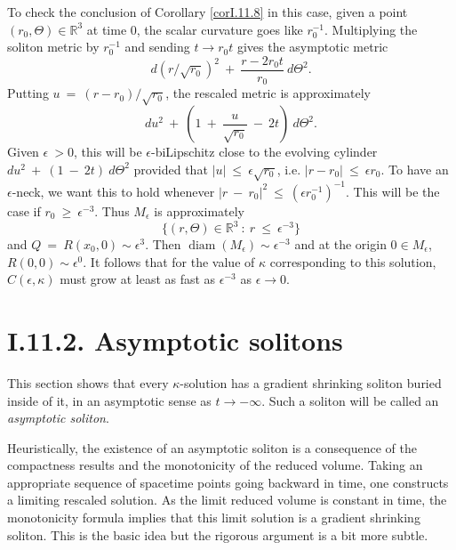 \documentclass[12pt]{amsart}
\newcommand{\diam}{\operatorname{diam}}
\newcommand{\R}{{\mathbb R}}
\numberwithin{equation}{section}
\theoremstyle{plain}
\theoremstyle{definition}
\theoremstyle{remark}
\begin{document}
To check the conclusion of Corollary \ref{corI.11.8}
in this case,
given a point $(r_0, \Theta) \in \R^3$ at time $0$, the scalar
curvature goes like $r_0^{-1}$. Multiplying the soliton metric by
$r_0^{-1}$ and sending $t \rightarrow r_0 t$ gives the asymptotic metric
\begin{equation}
d(r/\sqrt{r_0})^2 \:
+ \: \frac{r-2r_0t}{r_0} \: d\Theta^2.
\end{equation}
Putting $u \: = \: (r - r_0)/\sqrt{r_0}$,
the rescaled metric is approximately 
\begin{equation}
du^2 \: + \: 
\left( 1 \: + \: \frac{u}{\sqrt{r_0}} \: - \: {2t} \right)
\: d\Theta^2.
\end{equation}
Given $\epsilon \: > 0$, this will be $\epsilon$-biLipschitz close to 
the evolving cylinder
$du^2 \: + \: 
\left( 1 \: - \: {2t} \right)
\: d\Theta^2$ provided that $|u| \: \le \: \epsilon \sqrt{r_0}$,
i.e. $|r-r_0| \: \le \: \epsilon r_0$. To have an $\epsilon$-neck,
we want this to hold whenever $|r \: - \: r_0|^2 \: \le \: 
(\epsilon r_0^{-1})^{-1}$. This will be the case if $r_0 \: \ge \:
\epsilon^{-3}$. Thus $M_\epsilon$ is approximately
\begin{equation}
\{ (r, \Theta) \in \R^3 \: : \: r \: \le \: \epsilon^{-3} \}  
\end{equation}
and $Q \: = \: R(x_0,0) \sim \epsilon^3$. 
Then $\diam(M_\epsilon) \sim \epsilon^{-3}$
and at the origin $0 \in M_\epsilon$,
$R(0, 0) \sim \epsilon^0$. It follows that for the value of
$\kappa$ corresponding to this solution, $C(\epsilon, \kappa)$ must
grow at least as fast as $\epsilon^{-3}$ as $\epsilon \rightarrow 0$.

\section{I.11.2. Asymptotic solitons} \label{I.11.2}

This section shows that every $\kappa$-solution has a gradient shrinking
soliton buried inside of it, in an asymptotic sense as $t \rightarrow -\infty$.
Such a soliton will be called an {\em asymptotic soliton}.

Heuristically, the existence of an asymptotic soliton is
a consequence of the compactness results and 
the monotonicity of the reduced volume.  Taking an appropriate 
sequence of
spacetime points going backward in time, one constructs a
limiting rescaled solution. As the limit reduced volume
is constant in time, the monotonicity formula implies that
this limit solution is a gradient shrinking soliton. This is
the basic idea but
the rigorous argument is a bit more subtle.
\end{document}
